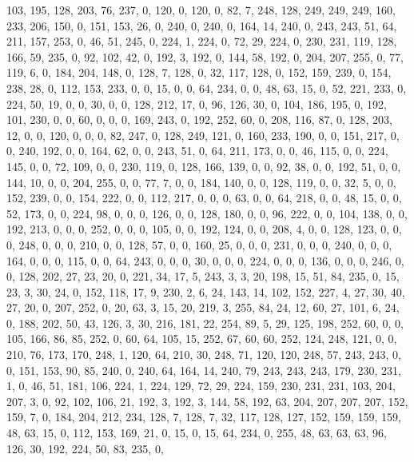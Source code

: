 \begin{DoxyCode}
       103, 195, 128, 203, 76, 237, 0, 120, 0, 120, 0, 82, 7, 248, 128, 249, 249, 249, 160, 233, 206, 150, 0, 151,
       153, 26, 0, 240, 0, 240, 0, 164, 14, 240, 0, 243, 243, 51, 64, 211, 157, 253, 0, 46, 51, 245, 0, 224, 1,
       224, 0, 72, 29, 224, 0, 230, 231, 119, 128, 166, 59, 235, 0, 92, 102, 42, 0, 192, 3, 192, 0, 144, 58, 192, 0,
       204, 207, 255, 0, 77, 119, 6, 0, 184, 204, 148, 0, 128, 7, 128, 0, 32, 117, 128, 0, 152, 159, 239, 0, 154,
       238, 28, 0, 112, 153, 233, 0, 0, 15, 0, 0, 64, 234, 0, 0, 48, 63, 15, 0, 52, 221, 233, 0, 224, 50, 19, 0, 0,
       30, 0, 0, 128, 212, 17, 0, 96, 126, 30, 0, 104, 186, 195, 0, 192, 101, 230, 0, 0, 60, 0, 0, 0, 169, 243, 0,
       192, 252, 60, 0, 208, 116, 87, 0, 128, 203, 12, 0, 0, 120, 0, 0, 0, 82, 247, 0, 128, 249, 121, 0, 160, 233,
       190, 0, 0, 151, 217, 0, 0, 240, 192, 0, 0, 164, 62, 0, 0, 243, 51, 0, 64, 211, 173, 0, 0, 46, 115, 0, 0, 224,
       145, 0, 0, 72, 109, 0, 0, 230, 119, 0, 128, 166, 139, 0, 0, 92, 38, 0, 0, 192, 51, 0, 0, 144, 10, 0, 0,
       204, 255, 0, 0, 77, 7, 0, 0, 184, 140, 0, 0, 128, 119, 0, 0, 32, 5, 0, 0, 152, 239, 0, 0, 154, 222, 0, 0, 112,
       217, 0, 0, 0, 63, 0, 0, 64, 218, 0, 0, 48, 15, 0, 0, 52, 173, 0, 0, 224, 98, 0, 0, 0, 126, 0, 0, 128, 180,
       0, 0, 96, 222, 0, 0, 104, 138, 0, 0, 192, 213, 0, 0, 0, 252, 0, 0, 0, 105, 0, 0, 192, 124, 0, 0, 208, 4, 0,
       0, 128, 123, 0, 0, 0, 248, 0, 0, 0, 210, 0, 0, 128, 57, 0, 0, 160, 25, 0, 0, 0, 231, 0, 0, 0, 240, 0, 0, 0,
       164, 0, 0, 0, 115, 0, 0, 64, 243, 0, 0, 0, 30, 0, 0, 0, 224, 0, 0, 0, 136, 0, 0, 0, 246, 0, 0, 128, 202, 27,
       23, 20, 0, 221, 34, 17, 5, 243, 3, 3, 20, 198, 15, 51, 84, 235, 0, 15, 23, 3, 30, 24, 0, 152, 118, 17, 9,
       230, 2, 6, 24, 143, 14, 102, 152, 227, 4, 27, 30, 40, 27, 20, 0, 207, 252, 0, 20, 63, 3, 15, 20, 219, 3, 255,
       84, 24, 12, 60, 27, 101, 6, 24, 0, 188, 202, 50, 43, 126, 3, 30, 216, 181, 22, 254, 89, 5, 29, 125, 198,
       252, 60, 0, 0, 105, 166, 86, 85, 252, 0, 60, 64, 105, 15, 252, 67, 60, 60, 252, 124, 248, 121, 0, 0, 210, 76,
       173, 170, 248, 1, 120, 64, 210, 30, 248, 71, 120, 120, 248, 57, 243, 243, 0, 0, 151, 153, 90, 85, 240, 0,
       240, 64, 164, 14, 240, 79, 243, 243, 243, 179, 230, 231, 1, 0, 46, 51, 181, 106, 224, 1, 224, 129, 72, 29, 224,
       159, 230, 231, 231, 103, 204, 207, 3, 0, 92, 102, 106, 21, 192, 3, 192, 3, 144, 58, 192, 63, 204, 207, 207,
       207, 152, 159, 7, 0, 184, 204, 212, 234, 128, 7, 128, 7, 32, 117, 128, 127, 152, 159, 159, 159, 48, 63, 15,
       0, 112, 153, 169, 21, 0, 15, 0, 15, 64, 234, 0, 255, 48, 63, 63, 63, 96, 126, 30, 192, 224, 50, 83, 235, 0,

\end{DoxyCode}
